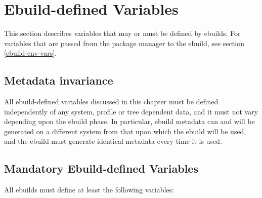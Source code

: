 \chapter{Ebuild-defined Variables}
\label{ebuild-vars}

\note This section describes variables that may or must be defined by ebuilds. For
variables that are passed from the package manager to the ebuild, see section \ref{ebuild-env-vars}.

\section{Metadata invariance}

All ebuild-defined variables discussed in this chapter must be defined independently of
any system, profile or tree dependent data, and it must not vary depending upon the ebuild
phase. In particular, ebuild metadata can and will be generated on a different system from that upon
which the ebuild will be used, and the ebuild must generate identical metadata every time it
is used.

\section{Mandatory Ebuild-defined Variables}

All ebuilds must define at least the following variables:

